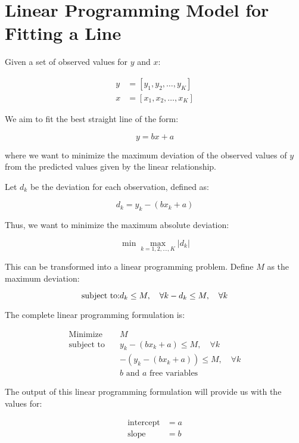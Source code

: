 \documentclass{article}
\begin{document}
\section*{Linear Programming Model for Fitting a Line}

Given a set of observed values for \( y \) and \( x \):

\[
\begin{aligned}
y & = [y_1, y_2, \ldots, y_K] \\
x & = [x_1, x_2, \ldots, x_K]
\end{aligned}
\]

We aim to fit the best straight line of the form:

\[
y = bx + a
\]

where we want to minimize the maximum deviation of the observed values of \( y \) from the predicted values given by the linear relationship.

Let \( d_k \) be the deviation for each observation, defined as:

\[
d_k = y_k - (bx_k + a)
\]

Thus, we want to minimize the maximum absolute deviation:

\[
\min \max_{k=1,2,\ldots,K} |d_k|
\]

This can be transformed into a linear programming problem. Define \( M \) as the maximum deviation:

\[
\text{subject to:} \\
d_k \leq M, \quad \forall k \\
-d_k \leq M, \quad \forall k
\]

The complete linear programming formulation is:

\[
\begin{aligned}
\text{Minimize} \quad & M \\
\text{subject to} \quad & y_k - (bx_k + a) \leq M, \quad \forall k \\
& -(y_k - (bx_k + a)) \leq M, \quad \forall k \\
& b \text{ and } a \text{ free variables}
\end{aligned}
\]

The output of this linear programming formulation will provide us with the values for:

\[
\begin{aligned}
\text{intercept} & = a \\
\text{slope} & = b
\end{aligned}
\]
\end{document}
